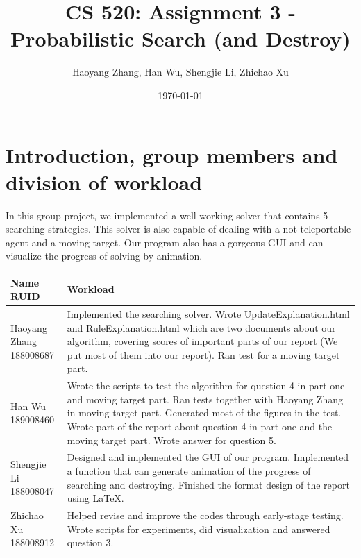\documentclass[letter]{article}
\title{CS 520: Assignment 3 - Probabilistic Search (and Destroy)}
\author{Haoyang Zhang, Han Wu, Shengjie Li, Zhichao Xu}
\date{\today}
\begin{document}
\maketitle

\section{Introduction, group members and division of workload}
\label{sec:Introduction}

In this group project, we implemented a well-working solver that contains 5 searching strategies. This solver is also capable of dealing with a not-teleportable agent and a moving target. Our program also has a gorgeous GUI and can visualize the progress of solving by animation. \\
\begin{tabular}{| p{2.5cm} | p{\textwidth -3.5cm} |}
	\hline
	\makecell[c]{Name \\ RUID} & Workload \\
	\hline
	\makecell[c]{Haoyang Zhang \\ 188008687} & {Implemented the searching solver. Wrote UpdateExplanation.html and RuleExplanation.html which are two documents about our algorithm, covering scores of important parts of our report (We put most of them into our report). Ran test for a moving target part.} \\
	\hline
	\makecell[c]{Han Wu \\ 189008460} & {Wrote the scripts to test the algorithm for question 4 in part one and moving target part. Ran tests together with Haoyang Zhang in moving target part. Generated most of the figures in the test. Wrote part of the report about question 4 in part one and the moving target part. Wrote answer for question 5.} \\
	\hline
	\makecell[c]{Shengjie Li \\ 188008047} & {Designed and implemented the GUI of our program. Implemented a function that can generate animation of the progress of searching and destroying. Finished the format design of the report using \LaTeX. } \\
	\hline
	\makecell[c]{Zhichao Xu \\ 188008912} & {Helped revise and improve the codes through early-stage testing. Wrote scripts for experiments, did visualization and answered question 3.} \\
	\hline
\end{tabular}
\end{document}
